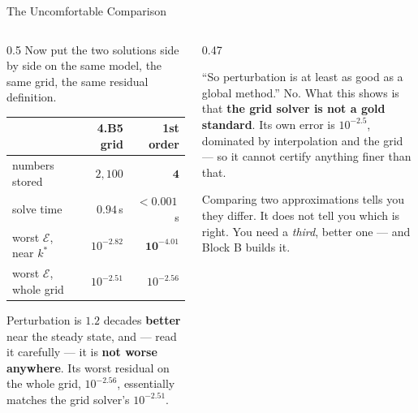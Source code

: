 \begin{frame}{The Uncomfortable Comparison}
\begin{columns}[T]
\begin{column}{0.5\textwidth}
\small
Now put the two solutions side by side on the same model, the same grid, the same residual definition.
\medskip
\begin{center}\footnotesize
\begin{tabularx}{\linewidth}{@{}>{\raggedright\arraybackslash}X r r@{}}
\toprule
 & \textbf{4.B5 grid} & \textbf{1st order} \\
\midrule
numbers stored & $2{,}100$ & $\mathbf{4}$ \\
solve time & $0.94$\,s & $<0.001$\,s \\
worst $\mathcal{E}$, near $k^{*}$ & $10^{-2.82}$ & $\mathbf{10^{-4.01}}$ \\
worst $\mathcal{E}$, whole grid & $10^{-2.51}$ & $10^{-2.56}$ \\
\bottomrule
\end{tabularx}
\end{center}
\medskip
Perturbation is $1.2$ decades \textbf{better} near the steady state, and --- read it carefully --- it is \textbf{not worse anywhere}. Its worst residual on the whole grid, $10^{-2.56}$, essentially matches the grid solver's $10^{-2.51}$.
\end{column}
\begin{column}{0.47\textwidth}
\begin{cautionbox}[title=\textbf{The wrong conclusion}]\small
``So perturbation is at least as good as a global method.'' No. What this shows is that \textbf{the grid solver is not a gold standard}. Its own error is $10^{-2.5}$, dominated by interpolation and the grid --- so it cannot certify anything finer than that.
\end{cautionbox}
\medskip
\begin{takeawaybox}\footnotesize
Comparing two approximations tells you they differ. It does not tell you which is right. You need a \emph{third}, better one --- and Block B builds it.
\end{takeawaybox}
\end{column}
\end{columns}
\vspace{1mm}
\end{frame}

